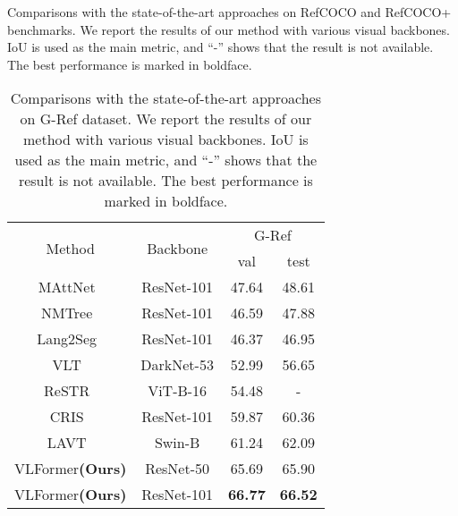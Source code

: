 \begin{table*}[ht]
\caption{Comparisons with the state-of-the-art approaches on RefCOCO and RefCOCO+ benchmarks. We report the results of our method with various visual backbones. IoU is used as the main metric, and  ``-'' shows that the result is not available. The best performance is marked in boldface.}
\label{tab:sota}
\end{table*}


\begin{table*}[ht]
\centering
\begin{tabular}{c|c|cc}
\toprule

\multirow{2}{*}{Method} & \multirow{2}{*}{Backbone} & \multicolumn{2}{c}{G-Ref} \\ \cline{3-4} 
                        &                           & val         & test        \\ \midrule
MAttNet~\cite{yu_mattnet_2018}                    & ResNet-101                   & 47.64           & 48.61          \\
NMTree~\cite{liu_learning_2019}                    & ResNet-101                & 46.59           & 47.88           \\
Lang2Seg~\cite{chen_referring_2019}                    & ResNet-101                  & 46.37           & 46.95           \\

VLT~\cite{ding_vision-language_2021}                     & DarkNet-53                 & 52.99       & 56.65       \\
ReSTR~\cite{kim_restr_2022}                   & ViT-B-16                    & 54.48       & -           \\
CRIS~\cite{wang_cris_2022}                    & ResNet-101                 & 59.87       & 60.36       \\
LAVT~\cite{yang_lavt_2022}                    & Swin-B                     & 61.24       & 62.09       \\ \midrule
VLFormer\textbf{(Ours)}                    & ResNet-50                    & 65.69       & 65.90       \\ 
VLFormer\textbf{(Ours)}                     & ResNet-101 & \textbf{66.77}       & \textbf{66.52}       \\
\bottomrule
\end{tabular}


\caption{Comparisons with the state-of-the-art approaches on G-Ref dataset. We report the results of our method with various visual backbones. IoU is used as the main metric, and  ``-'' shows that the result is not available. The best performance is marked in boldface.}
\label{tab:sota2}
\end{table*}
